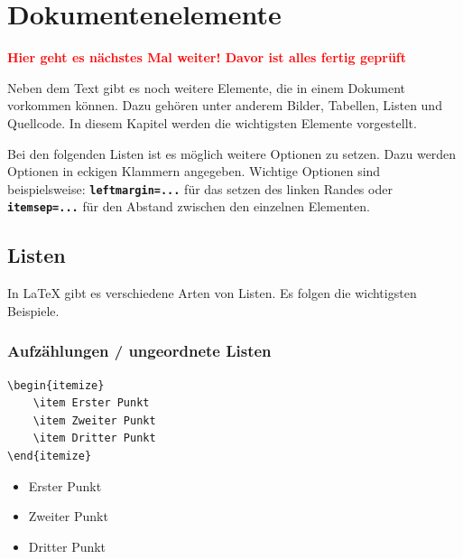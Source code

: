 \section{Dokumentenelemente}

\textbf{\large \textcolor{red}{Hier geht es nächstes Mal weiter! Davor ist alles fertig geprüft}}

Neben dem Text gibt es noch weitere Elemente, die in einem Dokument vorkommen können. Dazu gehören unter anderem Bilder, Tabellen, Listen und Quellcode. In diesem Kapitel werden die wichtigsten Elemente vorgestellt.

Bei den folgenden Listen ist es möglich weitere Optionen zu setzen. Dazu werden Optionen in eckigen Klammern angegeben.
Wichtige Optionen sind beispielsweise: \textbf{\texttt{leftmargin=...}} für das setzen des linken Randes oder \textbf{\texttt{itemsep=...}} für den Abstand zwischen den einzelnen Elementen.

\subsection{Listen}
In \LaTeX{} gibt es verschiedene Arten von Listen. Es folgen die wichtigsten Beispiele.

\subsubsection{Aufzählungen / ungeordnete Listen}

\begin{minipage}{0.58\textwidth}
    \begin{lstlisting}[language={[LaTeX]TeX}]
\begin{itemize}
    \item Erster Punkt
    \item Zweiter Punkt
    \item Dritter Punkt
\end{itemize}
\end{lstlisting}
\end{minipage}
\hfill
\begin{minipage}{0.35\textwidth}
    \begin{itemize}
        \item Erster Punkt
        \item Zweiter Punkt
        \item Dritter Punkt
    \end{itemize}
\end{minipage}

